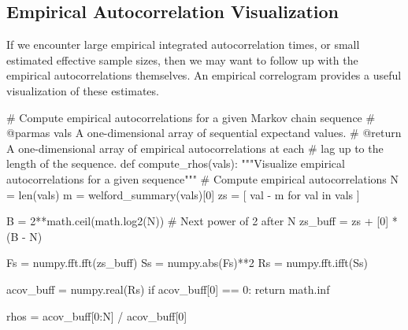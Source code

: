 \documentclass[
  letterpaper,
  DIV=11,
  numbers=noendperiod]{scrartcl}
\newenvironment{Shaded}{\begin{snugshade}}{\end{snugshade}}
\newcommand{\BuiltInTok}[1]{\textcolor[rgb]{0.00,0.23,0.31}{#1}}
\newcommand{\CommentTok}[1]{\textcolor[rgb]{0.37,0.37,0.37}{#1}}
\newcommand{\ControlFlowTok}[1]{\textcolor[rgb]{0.00,0.23,0.31}{#1}}
\newcommand{\DecValTok}[1]{\textcolor[rgb]{0.68,0.00,0.00}{#1}}
\newcommand{\KeywordTok}[1]{\textcolor[rgb]{0.00,0.23,0.31}{#1}}
\newcommand{\NormalTok}[1]{\textcolor[rgb]{0.00,0.23,0.31}{#1}}
\newcommand{\OperatorTok}[1]{\textcolor[rgb]{0.37,0.37,0.37}{#1}}
\begin{document}
\subsection{Empirical Autocorrelation
Visualization}\label{empirical-autocorrelation-visualization}

If we encounter large empirical integrated autocorrelation times, or
small estimated effective sample sizes, then we may want to follow up
with the empirical autocorrelations themselves. An empirical correlogram
provides a useful visualization of these estimates.

\begin{Shaded}
\begin{Highlighting}[]
\CommentTok{\# Compute empirical autocorrelations for a given Markov chain sequence}
\CommentTok{\# @parmas vals A one{-}dimensional array of sequential expectand values.}
\CommentTok{\# @return A one{-}dimensional array of empirical autocorrelations at each}
\CommentTok{\#         lag up to the length of the sequence.}
\KeywordTok{def}\NormalTok{ compute\_rhos(vals):}
  \CommentTok{"""Visualize empirical autocorrelations for a given sequence"""}
  \CommentTok{\# Compute empirical autocorrelations}
\NormalTok{  N }\OperatorTok{=} \BuiltInTok{len}\NormalTok{(vals)}
\NormalTok{  m }\OperatorTok{=}\NormalTok{ welford\_summary(vals)[}\DecValTok{0}\NormalTok{]}
\NormalTok{  zs }\OperatorTok{=}\NormalTok{ [ val }\OperatorTok{{-}}\NormalTok{ m }\ControlFlowTok{for}\NormalTok{ val }\KeywordTok{in}\NormalTok{ vals ]}

\NormalTok{  B }\OperatorTok{=} \DecValTok{2}\OperatorTok{**}\NormalTok{math.ceil(math.log2(N)) }\CommentTok{\# Next power of 2 after N}
\NormalTok{  zs\_buff }\OperatorTok{=}\NormalTok{ zs }\OperatorTok{+}\NormalTok{ [}\DecValTok{0}\NormalTok{] }\OperatorTok{*}\NormalTok{ (B }\OperatorTok{{-}}\NormalTok{ N)}

\NormalTok{  Fs }\OperatorTok{=}\NormalTok{ numpy.fft.fft(zs\_buff)}
\NormalTok{  Ss }\OperatorTok{=}\NormalTok{ numpy.}\BuiltInTok{abs}\NormalTok{(Fs)}\OperatorTok{**}\DecValTok{2}
\NormalTok{  Rs }\OperatorTok{=}\NormalTok{ numpy.fft.ifft(Ss)}

\NormalTok{  acov\_buff }\OperatorTok{=}\NormalTok{ numpy.real(Rs)}
  \ControlFlowTok{if}\NormalTok{ acov\_buff[}\DecValTok{0}\NormalTok{] }\OperatorTok{==} \DecValTok{0}\NormalTok{:}
    \ControlFlowTok{return}\NormalTok{ math.inf}

\NormalTok{  rhos }\OperatorTok{=}\NormalTok{ acov\_buff[}\DecValTok{0}\NormalTok{:N] }\OperatorTok{/}\NormalTok{ acov\_buff[}\DecValTok{0}\NormalTok{]}


\end{Highlighting}
\end{Shaded}
\end{document}

